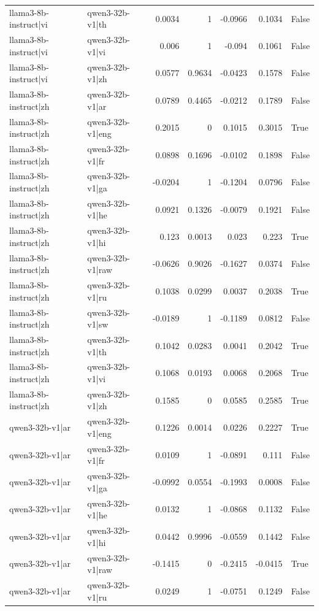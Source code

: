 \begin{table}
\begin{tabular}{l l r r r r l}
llama3-8b-instruct|vi & qwen3-32b-v1|th & 0.0034 & 1 & -0.0966 & 0.1034 & False \\
llama3-8b-instruct|vi & qwen3-32b-v1|vi & 0.006 & 1 & -0.094 & 0.1061 & False \\
llama3-8b-instruct|vi & qwen3-32b-v1|zh & 0.0577 & 0.9634 & -0.0423 & 0.1578 & False \\
llama3-8b-instruct|zh & qwen3-32b-v1|ar & 0.0789 & 0.4465 & -0.0212 & 0.1789 & False \\
llama3-8b-instruct|zh & qwen3-32b-v1|eng & 0.2015 & 0 & 0.1015 & 0.3015 & True \\
llama3-8b-instruct|zh & qwen3-32b-v1|fr & 0.0898 & 0.1696 & -0.0102 & 0.1898 & False \\
llama3-8b-instruct|zh & qwen3-32b-v1|ga & -0.0204 & 1 & -0.1204 & 0.0796 & False \\
llama3-8b-instruct|zh & qwen3-32b-v1|he & 0.0921 & 0.1326 & -0.0079 & 0.1921 & False \\
llama3-8b-instruct|zh & qwen3-32b-v1|hi & 0.123 & 0.0013 & 0.023 & 0.223 & True \\
llama3-8b-instruct|zh & qwen3-32b-v1|raw & -0.0626 & 0.9026 & -0.1627 & 0.0374 & False \\
llama3-8b-instruct|zh & qwen3-32b-v1|ru & 0.1038 & 0.0299 & 0.0037 & 0.2038 & True \\
llama3-8b-instruct|zh & qwen3-32b-v1|sw & -0.0189 & 1 & -0.1189 & 0.0812 & False \\
llama3-8b-instruct|zh & qwen3-32b-v1|th & 0.1042 & 0.0283 & 0.0041 & 0.2042 & True \\
llama3-8b-instruct|zh & qwen3-32b-v1|vi & 0.1068 & 0.0193 & 0.0068 & 0.2068 & True \\
llama3-8b-instruct|zh & qwen3-32b-v1|zh & 0.1585 & 0 & 0.0585 & 0.2585 & True \\
qwen3-32b-v1|ar & qwen3-32b-v1|eng & 0.1226 & 0.0014 & 0.0226 & 0.2227 & True \\
qwen3-32b-v1|ar & qwen3-32b-v1|fr & 0.0109 & 1 & -0.0891 & 0.111 & False \\
qwen3-32b-v1|ar & qwen3-32b-v1|ga & -0.0992 & 0.0554 & -0.1993 & 0.0008 & False \\
qwen3-32b-v1|ar & qwen3-32b-v1|he & 0.0132 & 1 & -0.0868 & 0.1132 & False \\
qwen3-32b-v1|ar & qwen3-32b-v1|hi & 0.0442 & 0.9996 & -0.0559 & 0.1442 & False \\
qwen3-32b-v1|ar & qwen3-32b-v1|raw & -0.1415 & 0 & -0.2415 & -0.0415 & True \\
qwen3-32b-v1|ar & qwen3-32b-v1|ru & 0.0249 & 1 & -0.0751 & 0.1249 & False \\

\end{tabular}
\end{table}
